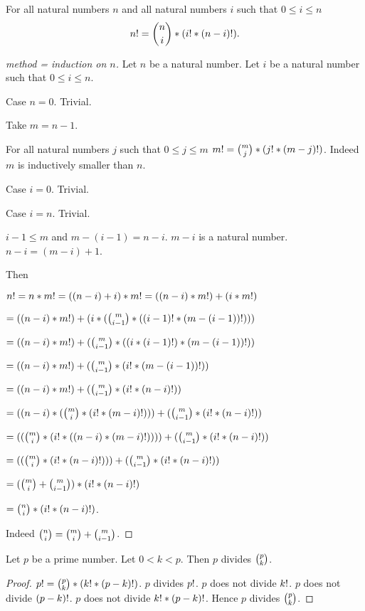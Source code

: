 \documentclass[english,11pt]{article}
\begin{document}
\begin{forthel}
\begin{lemma} For all natural numbers $n$ and all natural numbers $i$ 
such that  $0 \leq i \leq n$
$$n ! = {n \choose i} * (i ! * (n-i) !).$$
\end{lemma}

\begin{proof}[method = induction on $n$]
Let $n$ be a natural number.
Let $i$ be a natural number such that $0 \leq i \leq n$.

Case $n = 0$. Trivial.

Take $m = n - 1$.  

For all natural numbers $j$ such that $0 \leq j \leq m$ $m ! = 
{m \choose j} * (j ! * (m-j) !)$.
Indeed $m$ is inductively smaller than $n$.

Case $i = 0$. Trivial.

Case $i = n$. Trivial.

$i - 1 \leq m$ and $m - (i-1) = n - i$. $m - i$ is a natural number. 
$n - i = (m - i) + 1$.

Then

$n ! = n * m ! = ((n-i) + i) * m ! = ((n-i) * m !) + (i * m !)$

$= ((n-i) * m !) + (i * ({m \choose i-1} * ((i-1) ! * (m - (i-1)) !)))$

$= ((n-i) * m !) + ({m \choose i-1} * ((i * (i-1) !) * (m - (i-1)) !))$

$=  ((n-i) * m !) + ({m \choose i-1} * (i ! * (m - (i-1)) !))$

$=  ((n-i) * m !) + ({m \choose i-1} * (i ! * (n-i) !))$

$= ((n-i) * ({m \choose i} * (i ! * (m-i) !))) + ({m \choose i-1} * (i ! * (n-i) !))$

$= (({m \choose i} * (i ! * ((n-i) * (m-i) !)))) + ({m \choose i-1} * (i ! * (n-i) !))$

$= (({m \choose i} * (i ! * (n-i) !))) + ({m \choose i-1} * (i ! * (n-i) !))$

$= ({m \choose i} + {m \choose i-1}) * (i ! * (n-i) !) $

$=  {n \choose i} * (i ! * (n-i) !)$.

Indeed ${n \choose i} = {m \choose i} + {m \choose i-1}$.

\end{proof}


\begin{lemma}
Let $p$ be a prime number.
Let $0 < k < p$. Then
$p$ divides ${p \choose k}$.
\end{lemma}
\begin{proof}
$p ! = {p \choose k} * (k ! * (p-k) !)$.
$p$ divides $p !$.
$p$ does not divide $k !$.
$p$ does not divide $(p-k) !$.
$p$ does not divide $k ! * (p-k) !$.
Hence 
$p$ divides ${p \choose k}$.
\end{proof}

\end{forthel}
\end{document}
